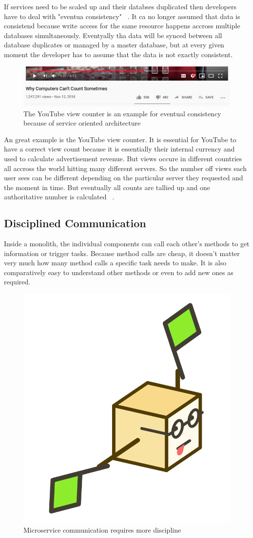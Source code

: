 If services need to be scaled up and their databses duplicated then developers have to deal with "eventua consistency" ~\cite{fowler.2015}. It ca no longer assumed that data is consistend because write access for the same resource happens accross multiple databases simultaneously. Eventyally tha data will be synced between all database duplicates or managed by a master database, but at every given moment the developer has to assume that the data is not exactly consistent.

\begin{figure}[ht]
  \centering
  \includegraphics[width=0.70\linewidth]{assets/youtube-view-counter.png}
  \caption{The YouTube view counter is an example for eventual consistency because of service oriented architecture}
\end{figure}

An great example is the YouTube view counter. It is essential for YouTube to have a correct view count because it is essentially their internal currency and used to calculate advertisement revenue. But views occure in different countries all accross the world hitting many different servers. So the number off views each user sees can be different depending on the particular server they requested and the moment in time. But eventually all counts are tallied up and one authoritative number is calculated
~\cite{scott.2018}.


\subsection{Disciplined Communication}

Inside a monolith, the individual components can call each other's methods to get information or trigger tasks. Because method calls are cheap, it doesn't matter very much how many method calls a specific task needs to make. It is also comparatively easy to understand other methods or even to add new ones as required.

\begin{figure}[ht]
  \centering
  \includegraphics[width=0.25\linewidth]{assets/illustration-microservice-flags.png}
  \caption{Microservice communication requires more discipline}
\end{figure}

